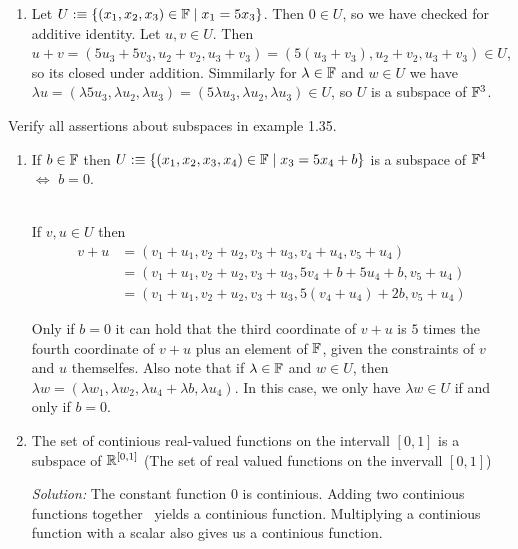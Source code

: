 \begin{xrcs}
\begin{enumerate}
    \item Let $U :\equiv \{(x_1, x_2, x_3) \in \mathbb{F} \mid x_1 = 5x_3\}$. Then $0 \in U$, so we have checked for additive identity. Let $u,v \in U$. Then $u+v= (5u_3+5v_3, u_2+v_2, u_3+v_3) = (5(u_3+v_3), u_2+v_2, u_3+v_3) \in U$, so its closed under addition. Simmilarly for $\lambda \in \mathbb{F}$ and $w \in U$ we have $\lambda u = (\lambda 5u_3, \lambda u_2, \lambda u_3) = (5 \lambda u_3, \lambda u_2, \lambda u_3) \in U$, so $U$ is a subspace of $\mathbb{F}^3$.
  \end{enumerate}

\end{xrcs}


\begin{xrcs}
  Verify all assertions about subspaces in example 1.35.

  \begin{enumerate}
    \item {
      If $b \in \mathbb{F}$ then $U :\equiv \{(x_1, x_2, x_3, x_4) \in \mathbb{F} \mid x_3 = 5x_4+b \}$ is a subspace of $\mathbb{F}^4$ $\iff$ $b=0$.

       \\
      If $v,u \in U$ then
      \begin{equation}
        \begin{aligned}
          v+u & = (v_1+u_1, v_2+u_2, v_3+u_3, v_4+u_4, v_5+u_4) \\
          & = (v_1+u_1, v_2+u_2, v_3+u_3, 5v_4+b+5u_4+b, v_5+u_4) \\
          & = (v_1+u_1, v_2+u_2, v_3+u_3, 5(v_4 + u_4) + 2b, v_5+u_4)
        \end{aligned}
      \end{equation}

      Only if $b=0$ it can hold that the third coordinate of $v+u$ is $5$ times the fourth coordinate of $v+u$ plus an element of $\mathbb{F}$, given the constraints of $v$ and $u$ themselfes. Also note that if $\lambda \in \mathbb{F}$ and $w \in U$, then $\lambda w = (\lambda w_1, \lambda w_2, \lambda u_4 + \lambda b, \lambda u_4)$. In this case, we only have $\lambda w \in U$ if and only if $b=0$.
    }

    \item{
      The set of continious real-valued functions on the intervall $[0,1]$ is a subspace of $\mathbb{R}^{[0,1]}$ (The set of real valued functions on the invervall $[0,1]$)

      \emph{Solution:} The constant function $0$ is continious. Adding two continious functions together ~yields a continious function. Multiplying a continious function with a scalar also gives us a continious function.
    }


\end{enumerate}
\end{xrcs}
